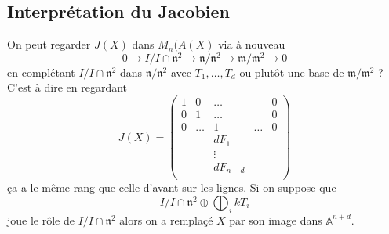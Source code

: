 \documentclass[a4paper,12pt]{book}
\newcommand{\A}{\mathbb{A}}
\newcommand{\m}{\mathfrak{m}}
\newcommand{\n}{\mathfrak{n}}
\theoremstyle{plain}
\theoremstyle{definition}
\theoremstyle{remark}
\begin{document}
\subsection{Interprétation du Jacobien}
On peut regarder $J(X)$ dans $M_n(A(X)$ via à nouveau
\[0\to I/I\cap \n^2\to \n/\n^2\to \m/\m^2\to 0\]
en complétant $I/I\cap\n^2$ dans $\n/\n^2$ avec $T_1,\ldots,
T_d$ ou plutôt une base de $\m/\m^2$ ? C'est à dire
en regardant 
\[J(X)=\begin{pmatrix}
    1& 0&\ldots&&0\\
    0&1&\ldots&& 0\\
    0&\ldots&1&\dots&0\\
     &&dF_1&&\\
     &&\vdots&&\\
     &&dF_{n-d}&&\\
    \end{pmatrix}
\]
ça a le même rang que celle d'avant sur les lignes. Si on suppose
que \[I/I\cap \n^2\oplus \bigoplus_i kT_i\] joue le rôle de
$I/I\cap \n^2$ alors on a remplaçé $X$ par son image dans 
$\A^{n+d}$.



\printbibliography
\end{document}
